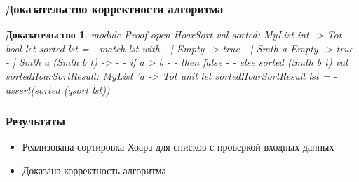 \documentclass{beamer}
\newtheorem{ruproof}{Доказательство}
\begin{document}
\begin{frame}
  \transwipe[direction=90]
  \frametitle{Доказательство корректности алгоритма}
  \begin{ruproof}
    module Proof\linebreak
    open HoarSort\linebreak
    val sorted: MyList int -> Tot bool\linebreak
    let sorted lst =\linebreak
     - match lst with\linebreak
     - | Empty -> true\linebreak
     - | Smth a Empty -> true\linebreak
     - | Smth a (Smth b t) ->\linebreak
     -  - if a > b\linebreak
     -  - then false\linebreak
     -  - else sorted (Smth b t)\linebreak
    val sortedHoarSortResult: MyList 'a -> Tot unit\linebreak
    let sortedHoarSortResult lst =\linebreak
     - assert(sorted (qsort lst)) \linebreak
  \end{ruproof}
\end{frame}

\begin{frame}
  \transwipe[direction=90]
  \frametitle{Результаты}
  \begin{itemize}
    \item Реализована сортировка Хоара для списков с проверкой входных данных
    \item Доказана корректность алгоритма
  \end{itemize}
\end{frame}
\end{document}
